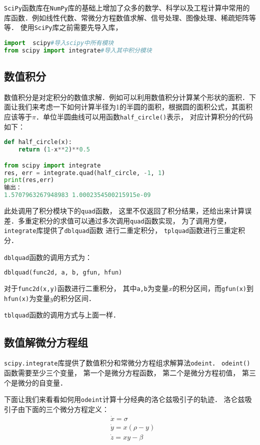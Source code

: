 
\verb|SciPy|函数库在\verb|NumPy|库的基础上增加了众多的数学、科学以及工程计算中常用的库函数．例如线性代数、常微分方程数值求解、信号处理、图像处理、稀疏矩阵等等．
使用\verb|SciPy|库之前需要先导入库，
\begin{lstlisting}[language=python]
import  scipy#导入scipy中所有模块
from scipy import integrate#导入其中积分模块
\end{lstlisting}
\subsection{数值积分}
数值积分是对定积分的数值求解．例如可以利用数值积分计算某个形状的面积．下面让我们来考虑一下如何计算半径为1的半圆的面积，根据圆的面积公式，其面积应该等于$\pi$．单位半圆曲线可以用函数\verb|half_circle()|表示， 对应计算积分的代码如下：
\begin{lstlisting}[language=python]
def half_circle(x):
    return (1-x**2)**0.5

from scipy import integrate
res, err = integrate.quad(half_circle, -1, 1)
print(res,err)
输出：
1.5707963267948983 1.0002354500215915e-09
\end{lstlisting}
此处调用了积分模块下的\verb|quad|函数， 这里不仅返回了积分结果，还给出来计算误差．多重定积分的求值可以通过多次调用\verb|quad|函数实现， 为了调用方便， \verb|integrate|库提供了\verb|dblquad|函数
进行二重定积分， \verb|tplquad|函数进行三重定积分．

\verb|dblquad|函数的调用方式为：
\begin{lstlisting}[language=python]
dblquad(func2d, a, b, gfun, hfun)
\end{lstlisting}
对于\verb|func2d(x,y)|函数进行二重积分， 其中\verb|a,b|为变量$x$的积分区间，而\verb|gfun(x)|到\verb|hfun(x)|为变量$y$的积分区间．

\verb|tblquad|函数的调用方式与上面一样．

\subsection{数值解微分方程组}
\verb|scipy.integrate|库提供了数值积分和常微分方程组求解算法\verb|odeint|．
\verb|odeint()|函数需要至少三个变量， 第一个是微分方程函数， 第二个是微分方程初值， 第三个是微分的自变量．

下面让我们来看看如何用\verb|odeint|计算十分经典的洛仑兹吸引子的轨迹． 洛仑兹吸引子由下面的三个微分方程定义：
\begin{align}
&\dot{x}=\sigma\\
&\dot{y}=x(\rho-y)\\
&\dot{z}=xy-\beta
\end{align}

